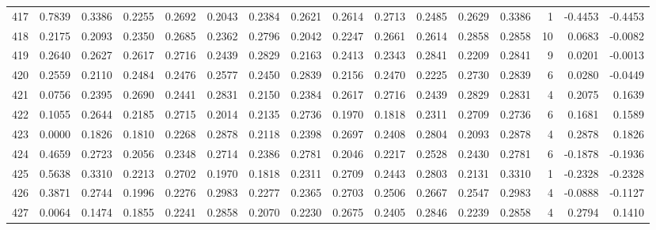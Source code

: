 \begin{tabular}{lrrrrrrrrrrrrrrr}
417 &      0.7839 &  0.3386 &  0.2255 &  0.2692 &  0.2043 &  0.2384 &  0.2621 &  0.2614 &  0.2713 &  0.2485 &   0.2629 &     0.3386 &      1 &                   -0.4453 &                    -0.4453 \\
418 &      0.2175 &  0.2093 &  0.2350 &  0.2685 &  0.2362 &  0.2796 &  0.2042 &  0.2247 &  0.2661 &  0.2614 &   0.2858 &     0.2858 &     10 &                    0.0683 &                    -0.0082 \\
419 &      0.2640 &  0.2627 &  0.2617 &  0.2716 &  0.2439 &  0.2829 &  0.2163 &  0.2413 &  0.2343 &  0.2841 &   0.2209 &     0.2841 &      9 &                    0.0201 &                    -0.0013 \\
420 &      0.2559 &  0.2110 &  0.2484 &  0.2476 &  0.2577 &  0.2450 &  0.2839 &  0.2156 &  0.2470 &  0.2225 &   0.2730 &     0.2839 &      6 &                    0.0280 &                    -0.0449 \\
421 &      0.0756 &  0.2395 &  0.2690 &  0.2441 &  0.2831 &  0.2150 &  0.2384 &  0.2617 &  0.2716 &  0.2439 &   0.2829 &     0.2831 &      4 &                    0.2075 &                     0.1639 \\
422 &      0.1055 &  0.2644 &  0.2185 &  0.2715 &  0.2014 &  0.2135 &  0.2736 &  0.1970 &  0.1818 &  0.2311 &   0.2709 &     0.2736 &      6 &                    0.1681 &                     0.1589 \\
423 &      0.0000 &  0.1826 &  0.1810 &  0.2268 &  0.2878 &  0.2118 &  0.2398 &  0.2697 &  0.2408 &  0.2804 &   0.2093 &     0.2878 &      4 &                    0.2878 &                     0.1826 \\
424 &      0.4659 &  0.2723 &  0.2056 &  0.2348 &  0.2714 &  0.2386 &  0.2781 &  0.2046 &  0.2217 &  0.2528 &   0.2430 &     0.2781 &      6 &                   -0.1878 &                    -0.1936 \\
425 &      0.5638 &  0.3310 &  0.2213 &  0.2702 &  0.1970 &  0.1818 &  0.2311 &  0.2709 &  0.2443 &  0.2803 &   0.2131 &     0.3310 &      1 &                   -0.2328 &                    -0.2328 \\
426 &      0.3871 &  0.2744 &  0.1996 &  0.2276 &  0.2983 &  0.2277 &  0.2365 &  0.2703 &  0.2506 &  0.2667 &   0.2547 &     0.2983 &      4 &                   -0.0888 &                    -0.1127 \\
427 &      0.0064 &  0.1474 &  0.1855 &  0.2241 &  0.2858 &  0.2070 &  0.2230 &  0.2675 &  0.2405 &  0.2846 &   0.2239 &     0.2858 &      4 &                    0.2794 &                     0.1410 \\

\end{tabular}
